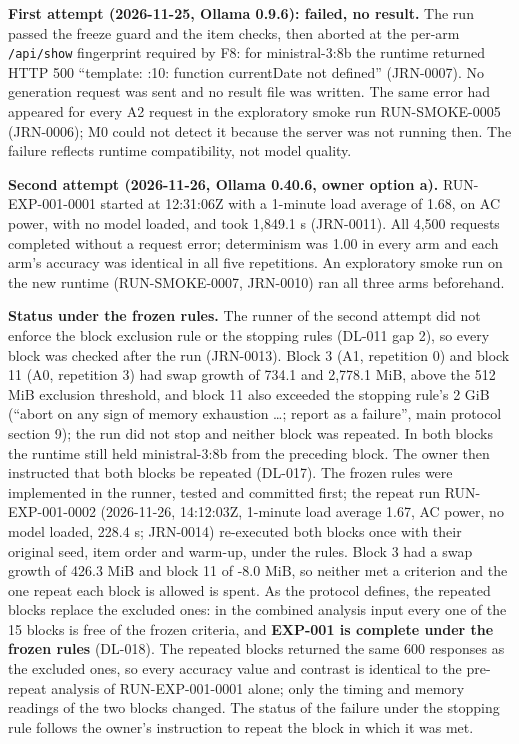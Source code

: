 \documentclass[
]{article}
\begin{document}
\textbf{First attempt (2026-11-25, Ollama 0.9.6): failed, no result.}
The run passed the freeze guard and the item checks, then aborted at the
per-arm \texttt{/api/show} fingerprint required by F8: for
ministral-3:8b the runtime returned HTTP 500 ``template: :10: function
currentDate not defined'' (JRN-0007). No generation request was sent and
no result file was written. The same error had appeared for every A2
request in the exploratory smoke run RUN-SMOKE-0005 (JRN-0006); M0 could
not detect it because the server was not running then. The failure
reflects runtime compatibility, not model quality.

\textbf{Second attempt (2026-11-26, Ollama 0.40.6, owner option a).}
RUN-EXP-001-0001 started at 12:31:06Z with a 1-minute load average of
1.68, on AC power, with no model loaded, and took 1,849.1 s (JRN-0011).
All 4,500 requests completed without a request error; determinism was
1.00 in every arm and each arm's accuracy was identical in all five
repetitions. An exploratory smoke run on the new runtime
(RUN-SMOKE-0007, JRN-0010) ran all three arms beforehand.

\textbf{Status under the frozen rules.} The runner of the second attempt
did not enforce the block exclusion rule or the stopping rules (DL-011
gap 2), so every block was checked after the run (JRN-0013). Block 3
(A1, repetition 0) and block 11 (A0, repetition 3) had swap growth of
734.1 and 2,778.1 MiB, above the 512 MiB exclusion threshold, and block
11 also exceeded the stopping rule's 2 GiB (``abort on any sign of
memory exhaustion \ldots; report as a failure'', main protocol section
9); the run did not stop and neither block was repeated. In both blocks
the runtime still held ministral-3:8b from the preceding block. The
owner then instructed that both blocks be repeated (DL-017). The frozen
rules were implemented in the runner, tested and committed first; the
repeat run RUN-EXP-001-0002 (2026-11-26, 14:12:03Z, 1-minute load
average 1.67, AC power, no model loaded, 228.4 s; JRN-0014) re-executed
both blocks once with their original seed, item order and warm-up, under
the rules. Block 3 had a swap growth of 426.3 MiB and block 11 of -8.0
MiB, so neither met a criterion and the one repeat each block is allowed
is spent. As the protocol defines, the repeated blocks replace the
excluded ones: in the combined analysis input every one of the 15 blocks
is free of the frozen criteria, and \textbf{EXP-001 is complete under
the frozen rules} (DL-018). The repeated blocks returned the same 600
responses as the excluded ones, so every accuracy value and contrast is
identical to the pre-repeat analysis of RUN-EXP-001-0001 alone; only the
timing and memory readings of the two blocks changed. The status of the
failure under the stopping rule follows the owner's instruction to
repeat the block in which it was met.
\end{document}
